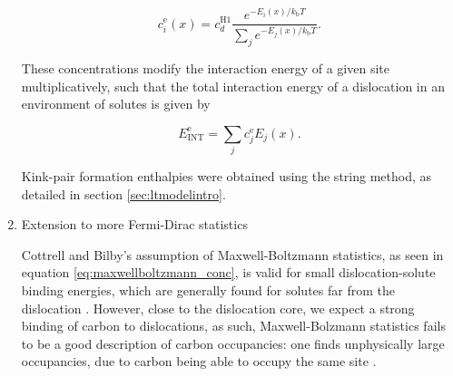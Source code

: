 \documentclass[a4paper,12pt,oneside,print,numbered,index,PageStyleIII]{PhDThesisPSnPDF}
\begin{document}
\begin{enumerate}
\[  c_{i}^{\text{e}}(x) = c_d^{\text{H}1} \frac{ e^{-E_i(x) /
     k_{\text{b}} T } }{\sum_j e^{-E_j(x) / k_{\text{b}}T} }.  \label{eq:maxwellboltzmann_conc}\]

These concentrations modify the interaction energy of a given site
multiplicatively, such that the total interaction energy of a dislocation in
an environment of solutes is given by

\[ E_{\text{INT}}^{\text{e}} = \sum_j c_j^{\text{e}} E_j(x).\]


Kink-pair formation enthalpies were obtained using the string method, as
detailed in section \ref{sec:ltmodelintro}.


\item Extension to more Fermi-Dirac statistics
\label{sec:orgf4a60c0}
\label{sec:concentration_statistics_discussion}

Cottrell and Bilby's assumption of Maxwell-Boltzmann statistics, as seen in
equation \eqref{eq:maxwellboltzmann_conc}, is valid for small
dislocation-solute binding energies, which are generally found for solutes far from the
dislocation \cite{Veiga2013}. However, close to the dislocation core, we
expect a strong binding of carbon to dislocations, as such, Maxwell-Bolzmann
statistics fails to be a good description of carbon occupancies: one finds
unphysically large occupancies, due to carbon being able to occupy the same
site \cite{Nematollahi2016}.


\end{enumerate}
\end{document}
